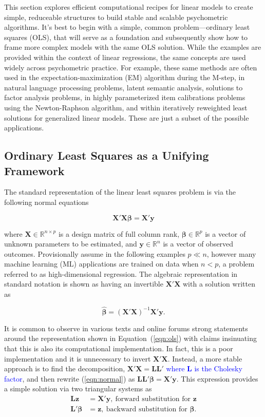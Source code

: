 \documentclass[12pt]{article}
\begin{document}
This section explores efficient computational recipes for linear models to create simple, reduceable structures to build stable and scalable psychometric algorithms. It's best to begin with a simple, common problem---ordinary least squares (OLS), that will serve as a foundation and subsequently show how to frame more complex models with the same OLS solution. While the examples are provided within the context of linear regressions, the same concepts are used widely across psychometric practice. For example, these same methods are often used in the expectation-maximization (EM) algorithm during the M-step, in natural language processing problems, latent semantic analysis, solutions to factor analysis problems, in highly parameterized item calibrations problems using the Newton-Raphson algorithm, and within iteratively reweighted least solutions for generalized linear models. These are just a subset of the possible applications.  

\subsection*{Ordinary Least Squares as a Unifying Framework}

The standard representation of the linear least squares problem is via the following normal equations \cite{mcandsearle:2001}   

\begin{equation}
\label{eqn:normal}
\bm{X'X\beta} = \bm{X'y}
\end{equation}

\noindent where $\bm{X}\in\mathbb{R}^{n \times p}$ is a design matrix of full column rank, $\bm{\beta} \in \mathbb{R}^p$ is a vector of unknown parameters to be estimated, and $\bm{y} \in \mathbb{R}^n$ is a vector of observed outcomes. Provisionally assume in the following examples $p \ll n$, however many machine learning (ML) applications are trained on data when $n < p$, a problem referred to as high-dimensional regression. The algebraic representation in standard notation is shown as having an invertible $\bm{X'X}$ with a solution written as

\begin{equation}
\label{eqn:ols}
\widehat{\bm{\beta}} = \bm{(X'X)}^{-1} \bm{X'y}.
\end{equation}

It is common to observe in various texts and online forums strong statements around the representation shown in Equation~(\ref{eqn:ols}) with claims insinuating that this is also its computational implementation. In fact, this is a poor implementation and it is unnecessary to invert $\bm{X'X}$. Instead, a more stable approach is to find the decomposition, $\bm{X'X} = \bm{LL'}$ \textcolor{blue}{where $\bm{L}$ is the Cholesky factor}, and then rewrite (\ref{eqn:normal}) as $\bm{LL'\beta} = \bm{X'y}$. This expression provides a simple solution via two triangular systems as
\begin{align}
\label{eqn:triangle}
\bm{Lz}  & =  \bm{X'y}, \ \text{forward substitution for $\bm{z}$}\\
\bm{L'\beta}  &=  \bm{z}, \ \text{backward substitution for $\bm{\beta}$} \nonumber.  
\end{align}
\end{document}
